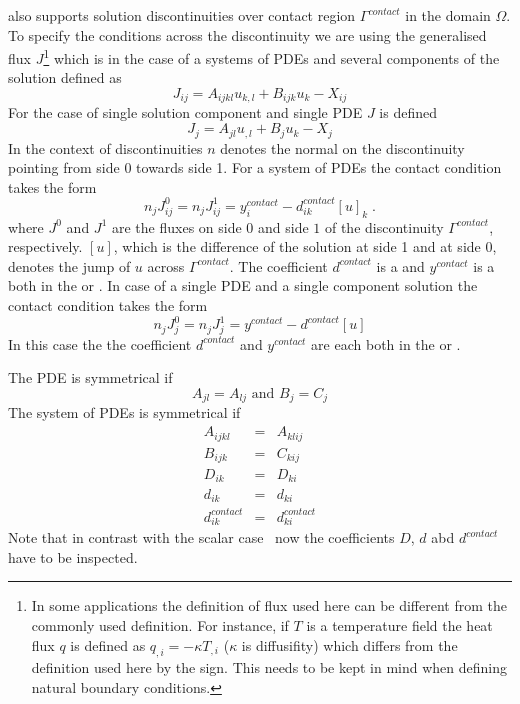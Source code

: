 \LinearPDE also supports solution discontinuities  over contact region $\Gamma^{contact}$
in the domain $\Omega$. To specify the conditions across the discontinuity we are using the
generalised flux $J$\footnote{In some applications the definition of flux used here can be different from the commonly used definition. For instance, if $T$ is a temperature field the heat flux $q$ is defined as $q_{,i}=-\kappa T_{,i}$ ($\kappa$ is diffusifity) which differs from the definition used here by the sign. This needs to be kept in mind when defining natural boundary conditions.} which is in the case of a systems of PDEs and several components of the solution
defined as
\begin{equation}\label{LINEARPDE.SYSTEM.5}
J_{ij}=A_{ijkl}u_{k,l}+B_{ijk}u_{k}-X_{ij}
\end{equation}
For the case of single solution component and single PDE $J$ is defined
\begin{equation}\label{LINEARPDE.SINGLE.5}
J_{j}=A_{jl}u_{,l}+B_{j}u_{k}-X_{j}
\end{equation}
In the context of discontinuities  $n$ denotes the normal on the
discontinuity pointing from side 0 towards side 1. For a system of PDEs
the contact condition takes the form
\begin{equation}\label{LINEARPDE.SYSTEM.6}
n_{j} J^{0}_{ij}=n_{j} J^{1}_{ij}=y^{contact}_{i} - d^{contact}_{ik} [u]_{k} \; .
\end{equation}
where $J^{0}$ and $J^{1}$ are the fluxes on side $0$ and side $1$ of the
discontinuity $\Gamma^{contact}$, respectively. $[u]$, which is the difference
of the solution at side 1 and at side 0, denotes the jump of $u$ across $\Gamma^{contact}$.
The coefficient $d^{contact}$ is a \RankTwo and $y^{contact}$ is a
\RankOne both in the \FunctionOnContactZero or \FunctionOnContactOne.
In case of a single PDE and a single component solution the contact condition takes the form
\begin{equation}\label{LINEARPDE.SINGLE.6}
n_{j} J^{0}_{j}=n_{j} J^{1}_{j}=y^{contact} - d^{contact}[u]
\end{equation}
In this case the the coefficient $d^{contact}$ and $y^{contact}$ are each \Scalar
both in the \FunctionOnContactZero or \FunctionOnContactOne.

The PDE is symmetrical  if
\begin{equation}\label{LINEARPDE.SINGLE.4}
A_{jl}=A_{lj} \mbox{ and } B_{j}=C_{j}
\end{equation}
The system of PDEs is symmetrical  if
\begin{eqnarray}
\label{LINEARPDE.SYSTEM.4}
A_{ijkl}&=&A_{klij} \\
B_{ijk}&=&C_{kij} \\
D_{ik}&=&D_{ki} \\
d_{ik}&=&d_{ki} \\
d^{contact}_{ik}&=&d^{contact}_{ki}
\end{eqnarray}
Note that in contrast with the scalar case~ now the coefficients $D$, $d$ abd $d^{contact}$
have to be inspected.

